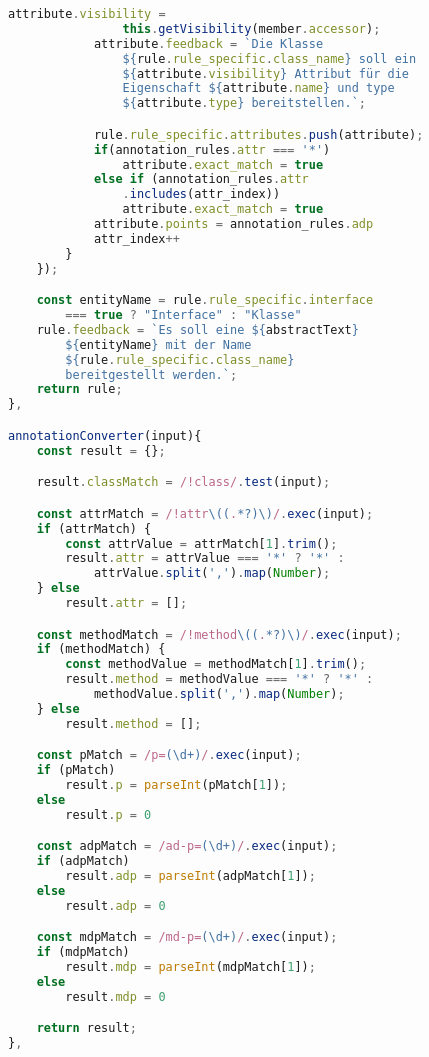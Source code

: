 \begin{lstlisting}[caption={Class Definition Rule}, label={lst:rule_object_gen}, language=javascript]
            attribute.visibility =
                this.getVisibility(member.accessor);
            attribute.feedback = `Die Klasse
                ${rule.rule_specific.class_name} soll ein
                ${attribute.visibility} Attribut für die
                Eigenschaft ${attribute.name} und type
                ${attribute.type} bereitstellen.`;

            rule.rule_specific.attributes.push(attribute);
            if(annotation_rules.attr === '*')
                attribute.exact_match = true
            else if (annotation_rules.attr
                .includes(attr_index))
                attribute.exact_match = true
            attribute.points = annotation_rules.adp
            attr_index++
        }
    });

    const entityName = rule.rule_specific.interface
        === true ? "Interface" : "Klasse"
    rule.feedback = `Es soll eine ${abstractText}
        ${entityName} mit der Name
        ${rule.rule_specific.class_name}
        bereitgestellt werden.`;
    return rule;
},

annotationConverter(input){
    const result = {};

    result.classMatch = /!class/.test(input);

    const attrMatch = /!attr\((.*?)\)/.exec(input);
    if (attrMatch) {
        const attrValue = attrMatch[1].trim();
        result.attr = attrValue === '*' ? '*' :
            attrValue.split(',').map(Number);
    } else
        result.attr = [];

    const methodMatch = /!method\((.*?)\)/.exec(input);
    if (methodMatch) {
        const methodValue = methodMatch[1].trim();
        result.method = methodValue === '*' ? '*' :
            methodValue.split(',').map(Number);
    } else
        result.method = [];

    const pMatch = /p=(\d+)/.exec(input);
    if (pMatch)
        result.p = parseInt(pMatch[1]);
    else
        result.p = 0

    const adpMatch = /ad-p=(\d+)/.exec(input);
    if (adpMatch)
        result.adp = parseInt(adpMatch[1]);
    else
        result.adp = 0

    const mdpMatch = /md-p=(\d+)/.exec(input);
    if (mdpMatch)
        result.mdp = parseInt(mdpMatch[1]);
    else
        result.mdp = 0

    return result;
},
\end{lstlisting}

\newpage

